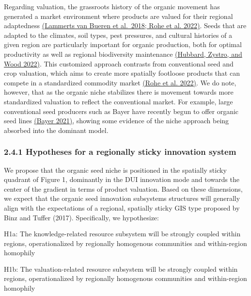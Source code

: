 \documentclass[twoside,12pt,final]{ucthesis-CA2012}
\begin{document}
\begin{ucmainmatter}
Regarding valuation, the grassroots history of the organic movement has
generated a market environment where products are valued for their
regional adaptedness \href{https://www.zotero.org/google-docs/?T5KMY7}{(Lammerts van Bueren et al.~2018; Rohe et al.
2022)}. Seeds that are
adapted to the climates, soil types, pest pressures, and cultural
histories of a given region are particularly important for organic
production, both for optimal productivity as well as regional
biodiversity maintenance \href{https://www.zotero.org/google-docs/?0xuSfc}{(Hubbard, Zystro, and Wood
2022)}. This customized
approach contrasts from conventional seed and crop valuation, which aims
to create more spatially footloose products that can compete in a
standardized commodity market \href{https://www.zotero.org/google-docs/?YS9MQV}{(Rohe et al.
2022)}. We do note, however,
that as the organic niche stabilizes there is movement towards more
standardized valuation to reflect the conventional market. For example,
large conventional seed producers such as Bayer have recently begun to
offer organic seed lines \href{https://www.zotero.org/google-docs/?IcfSOF}{(Bayer
2021)}, showing some
evidence of the niche approach being absorbed into the dominant model.

\hypertarget{hypotheses-for-a-regionally-sticky-innovation-system}{%
\subsubsection{2.4.1 Hypotheses for a regionally sticky innovation system}\label{hypotheses-for-a-regionally-sticky-innovation-system}}

We propose that the organic seed niche is positioned in the \textquotesingle spatially
sticky\textquotesingle{} quadrant of Figure 1, dominantly in the DUI innovation mode and
towards the center of the gradient in terms of product valuation. Based
on these dimensions, we expect that the organic seed innovation
subsystems\textquotesingle{} structures will generally align with the expectations of a
regional, spatially sticky GIS type proposed by Binz and Tuffer (2017).
Specifically, we hypothesize:

H1a: The knowledge-related resource subsystem will be strongly coupled
within regions, operationalized by regionally homogenous communities and
within-region homophily

H1b: The valuation-related resource subsystem will be strongly coupled
within regions, operationalized by regionally homogenous communities and
within-region homophily


\end{ucmainmatter}
\end{document}
